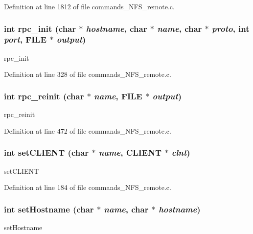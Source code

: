 Definition at line 1812 of file commands\_\-NFS\_\-remote.c.
\subsubsection[{rpc\_\-init}]{\setlength{\rightskip}{0pt plus 5cm}int rpc\_\-init (char $\ast$ {\em hostname}, \/  char $\ast$ {\em name}, \/  char $\ast$ {\em proto}, \/  int {\em port}, \/  FILE $\ast$ {\em output})}\label{commands__NFS__remote_8c_a7319b04b764e4966b934daae93b0d0ec}
rpc\_\-init 

Definition at line 328 of file commands\_\-NFS\_\-remote.c.
\subsubsection[{rpc\_\-reinit}]{\setlength{\rightskip}{0pt plus 5cm}int rpc\_\-reinit (char $\ast$ {\em name}, \/  FILE $\ast$ {\em output})}\label{commands__NFS__remote_8c_a1f7267c9861733c60944246875185900}
rpc\_\-reinit 

Definition at line 472 of file commands\_\-NFS\_\-remote.c.
\subsubsection[{setCLIENT}]{\setlength{\rightskip}{0pt plus 5cm}int setCLIENT (char $\ast$ {\em name}, \/  CLIENT $\ast$ {\em clnt})}\label{commands__NFS__remote_8c_a2a3805bb7043e832dde9e8f150dd6178}
setCLIENT 

Definition at line 184 of file commands\_\-NFS\_\-remote.c.
\subsubsection[{setHostname}]{\setlength{\rightskip}{0pt plus 5cm}int setHostname (char $\ast$ {\em name}, \/  char $\ast$ {\em hostname})}\label{commands__NFS__remote_8c_ac87ac8af2ccef1d7270f5cfe5cba4c5c}
setHostname 

